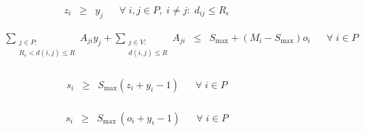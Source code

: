 \begin{figure}
		
		
		\begin{equation} \label{eq:set.z}
		\begin{array}{rrclcl}
		& z_{i} & \geq & y_{j} && \forall \; i , j \in P, \; i \neq j : \; d_{ij} \le R_{\epsilon} 
		\end{array}
		\end{equation}
		
		
		\begin{equation} \label{eq:setSub}
		\begin{array}{rrclcl}
		& \displaystyle \sum_{\substack{j \in P :\\ R_{\epsilon} < d(i,j) \le R }} A_{ji} y_{j} + \displaystyle \sum_{\substack{j \in V :\\ d(i,j) \le R }} A_{ji} & \leq & S_{\max} + (M_i - S_{\max}) o_i %
		&& \forall \; i \in P\\
		\end{array}
		\end{equation}
		
		
		\begin{equation} \label{eq:setSmaxZ}
		\begin{array}{rrclcl}
		&s_{i} & \geq & S_{\max} ( z_{i} + y_i - 1 ) && \forall \; i \in P \\
		\end{array}
		\end{equation}
		
		\begin{equation} \label{eq:setSmaxO}
		\begin{array}{rrclcl}
		&s_{i} & \geq & S_{\max} \,( o_{i} + y_{i} - 1 ) && \forall \; i \in P \\
		\end{array}
		\end{equation}
		

\end{figure}
